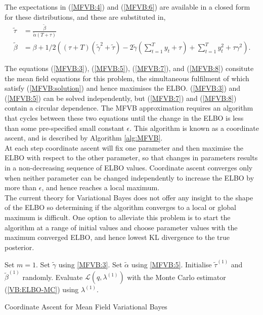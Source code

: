 \documentclass[
12pt, %
onehalfspacing, %
nohyperref, %
headsepline, %
chapterinoneline, %
]{MastersDoctoralThesis} %
\begin{document}
The expectations in (\ref{MFVB:4}) and (\ref{MFVB:6}) are available in a closed form for these distributions, and these are substituted in,
\begin{align}
\tilde{\tau} &= \frac{\tilde{\beta}}{\tilde{\alpha}(T + \tau)} \label{MFVB:7} \\
\tilde{\beta} &= \beta + 1/2\left((\tau + T)(\tilde{\gamma}^2 + \tilde{\tau}) - 2 \tilde{\gamma}\left(\sum_{t=1}^{T}y_t + \tau\right) + \sum_{t=1}^{T} y_t^2 + \tau \gamma^2 \right).\label{MFVB:8}
\end{align} 

The equations (\ref{MFVB:3}), (\ref{MFVB:5}), (\ref{MFVB:7}), and (\ref{MFVB:8}) consitute the mean field equations for this problem, the simultaneous fulfilment of which satisfy (\ref{MFVB:solution}) and hence maximises the ELBO. (\ref{MFVB:3}) and (\ref{MFVB:5}) can be solved independently, but (\ref{MFVB:7}) and (\ref{MFVB:8}) contain a circular dependence. The MFVB approximation requires an algorithm that cycles between these two equations until the change in the ELBO is less than some pre-specified small constant $\epsilon$. This algorithm is known as a coordinate ascent, and is described by Algorithm \ref{alg:MFVB}.
\\

At each step coordinate ascent will fix one parameter and then maximise the ELBO with respect to the other parameter, so that changes in parameters results in a non-decreasing sequence of ELBO values. Coordinate ascent converges only when neither parameter can be changed independently to increase the ELBO by more than $\epsilon$, and hence reaches a local maximum.
\\

The current theory for Variational Bayes does not offer any insight to the shape of the ELBO so determining if the algorithm converges to a local or global maximum is difficult. One option to alleviate this problem is to start the algorithm at a range of initial values and choose parameter values with the maximum converged ELBO, and hence lowest KL divergence to the true posterior. 
\\

\vspace{2mm}
\begin{algorithm}[H]
 Set $m = 1$.\;
 Set $\tilde{\gamma}$ using \ref{MFVB:3}.\;
 Set $\tilde{\alpha}$ using \ref{MFVB:5}.\;
 Initialise $\tilde{\tau}^{(1)}$ and $\tilde{\beta}^{(1)}$ randomly.\;
 Evaluate $\mathcal{L}(q, \lambda^{(1)})$ with the Monte Carlo estimator (\ref{VB:ELBO-MC}) using $\lambda^{(1)}$.\;
 \caption{Coordinate Ascent for Mean Field Variational Bayes}
 \label{alg:MFVB}
\end{algorithm}
\end{document}
